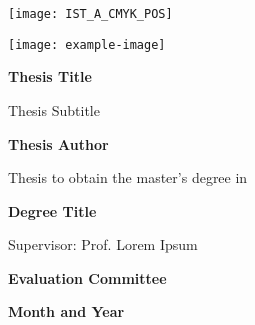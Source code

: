 \begin{titlepage}

\texttt{[image: IST\_A\_CMYK\_POS]}

\begin{center}
	\vspace*{15mm}
	\texttt{[image: example-image]}
	\vspace{\fill}

	{\LARGE\bfseries Thesis Title}

	\vspace{10mm}
	{\Large Thesis Subtitle}

	\vspace{10mm}
	{\Large\bfseries Thesis Author}

	\vspace{10mm}
	{\large Thesis to obtain the master's degree in}

	\medskip
	{\LARGE\bfseries Degree Title}

	\vspace{10mm}
	{\large Supervisor: Prof. Lorem Ipsum}

	\vspace{7mm}
	{\large\bfseries Evaluation Committee}


	\vspace{10mm}
	{\large\bfseries Month and Year}
\end{center}

\end{titlepage}

\cleardoublepage
